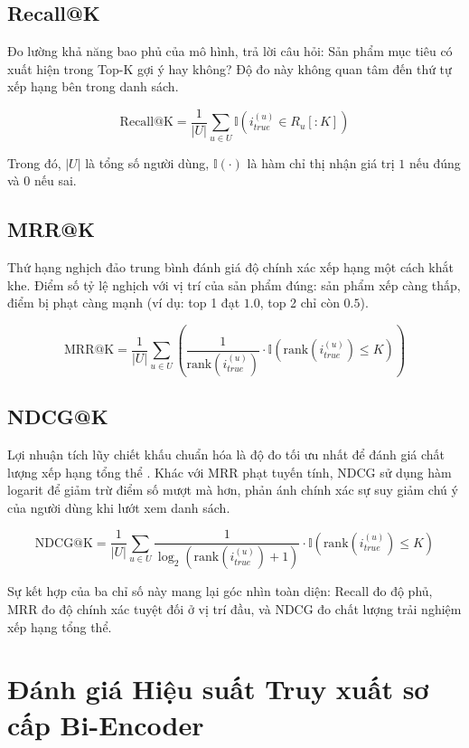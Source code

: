 \subsection{Recall@K }
Đo lường khả năng bao phủ của mô hình, trả lời câu hỏi: Sản phẩm mục tiêu có xuất hiện trong Top-K gợi ý hay không? \cite{47} Độ đo này không quan tâm đến thứ tự xếp hạng bên trong danh sách.

\begin{equation}
    \text{Recall@K} = \frac{1}{|U|} \sum_{u \in U} \mathbb{I}(i_{true}^{(u)} \in R_u[:K])
\end{equation}

Trong đó, $|U|$ là tổng số người dùng, $\mathbb{I}(\cdot)$ là hàm chỉ thị nhận giá trị $1$ nếu đúng và $0$ nếu sai.

\subsection{MRR@K}
Thứ hạng nghịch đảo trung bình đánh giá độ chính xác xếp hạng một cách khắt khe\cite{48}. Điểm số tỷ lệ nghịch với vị trí của sản phẩm đúng: sản phẩm xếp càng thấp, điểm bị phạt càng mạnh (ví dụ: top 1 đạt $1.0$, top 2 chỉ còn $0.5$).

\begin{equation}
    \text{MRR@K} = \frac{1}{|U|} \sum_{u \in U} \left( \frac{1}{\text{rank}(i_{true}^{(u)})} \cdot \mathbb{I}(\text{rank}(i_{true}^{(u)}) \le K) \right)
\end{equation}

\subsection{NDCG@K}
Lợi nhuận tích lũy chiết khấu chuẩn hóa là độ đo tối ưu nhất để đánh giá chất lượng xếp hạng tổng thể \cite{47}. Khác với MRR phạt tuyến tính, NDCG sử dụng hàm logarit để giảm trừ điểm số mượt mà hơn, phản ánh chính xác sự suy giảm chú ý của người dùng khi lướt xem danh sách.

\begin{equation}
    \text{NDCG@K} = \frac{1}{|U|} \sum_{u \in U} \frac{1}{\log_2(\text{rank}(i_{true}^{(u)}) + 1)} \cdot \mathbb{I}(\text{rank}(i_{true}^{(u)}) \le K)
\end{equation}

Sự kết hợp của ba chỉ số này mang lại góc nhìn toàn diện: Recall đo độ phủ, MRR đo độ chính xác tuyệt đối ở vị trí đầu, và NDCG đo chất lượng trải nghiệm xếp hạng tổng thể.

\section{Đánh giá Hiệu suất Truy xuất sơ cấp Bi-Encoder}
\label{sec:reranking_analysis}

